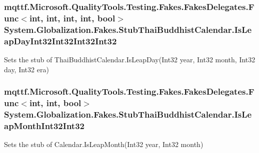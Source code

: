\hypertarget{class_system_1_1_globalization_1_1_fakes_1_1_stub_thai_buddhist_calendar_ae00bb20d1fa4d30dcc00090898ba6d7d}{
\subsubsection[{Is\-Leap\-Day\-Int32\-Int32\-Int32\-Int32}]{\setlength{\rightskip}{0pt plus 5cm}mqttf.\-Microsoft.\-Quality\-Tools.\-Testing.\-Fakes.\-Fakes\-Delegates.\-Func$<$int, int, int, int, bool$>$ System.\-Globalization.\-Fakes.\-Stub\-Thai\-Buddhist\-Calendar.\-Is\-Leap\-Day\-Int32\-Int32\-Int32\-Int32}}\label{class_system_1_1_globalization_1_1_fakes_1_1_stub_thai_buddhist_calendar_ae00bb20d1fa4d30dcc00090898ba6d7d}


Sets the stub of Thai\-Buddhist\-Calendar.\-Is\-Leap\-Day(\-Int32 year, Int32 month, Int32 day, Int32 era)

\hypertarget{class_system_1_1_globalization_1_1_fakes_1_1_stub_thai_buddhist_calendar_aaf1d5d5983be7849673c4f4674f1fd84}{
\subsubsection[{Is\-Leap\-Month\-Int32\-Int32}]{\setlength{\rightskip}{0pt plus 5cm}mqttf.\-Microsoft.\-Quality\-Tools.\-Testing.\-Fakes.\-Fakes\-Delegates.\-Func$<$int, int, bool$>$ System.\-Globalization.\-Fakes.\-Stub\-Thai\-Buddhist\-Calendar.\-Is\-Leap\-Month\-Int32\-Int32}}\label{class_system_1_1_globalization_1_1_fakes_1_1_stub_thai_buddhist_calendar_aaf1d5d5983be7849673c4f4674f1fd84}


Sets the stub of Calendar.\-Is\-Leap\-Month(\-Int32 year, Int32 month)

